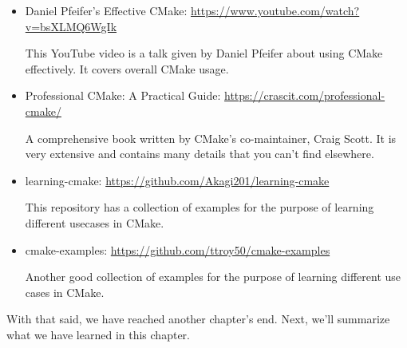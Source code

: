 \begin{itemize}
\item 
Daniel Pfeifer's Effective CMake: \url{https://www.youtube.com/watch?v=bsXLMQ6WgIk}

This YouTube video is a talk given by Daniel Pfeifer about using CMake effectively. It covers overall CMake usage.

\item 
Professional CMake: A Practical Guide: \url{https://crascit.com/professional-cmake/}

A comprehensive book written by CMake's co-maintainer, Craig Scott. It is very extensive and contains many details that you can't find elsewhere.

\item 
learning-cmake: \url{https://github.com/Akagi201/learning-cmake}

This repository has a collection of examples for the purpose of learning different usecases in CMake.

\item 
cmake-examples: \url{https://github.com/ttroy50/cmake-examples}

Another good collection of examples for the purpose of learning different use cases in CMake.
\end{itemize}

With that said, we have reached another chapter's end. Next, we'll summarize what we have learned in this chapter.
























